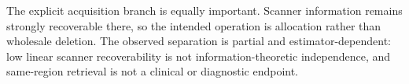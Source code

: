 The explicit acquisition branch is equally important. Scanner information remains strongly recoverable there, so the intended operation is allocation rather than wholesale deletion. The observed separation is partial and estimator-dependent: low linear scanner recoverability is not information-theoretic independence, and same-region retrieval is not a clinical or diagnostic endpoint.
